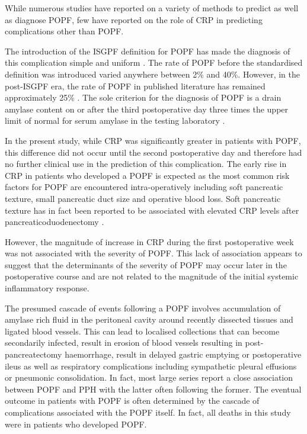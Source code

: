While numerous studies have reported on a variety of methods to predict as well as diagnose POPF, few have reported on the role of CRP in predicting complications other than POPF.

The introduction of the ISGPF definition for POPF has made the diagnosis of this complication simple and uniform \parencite{bassi_postoperative_2005}.
The rate of POPF before the standardised definition was introduced varied anywhere between 2\% and 40\%. 
However, in the post-ISGPF era, the rate of POPF in published literature has remained approximately 25\% \parencite{knight_evaluation_2010}. 
The sole criterion for the diagnosis of POPF is a drain amylase content on or after the third postoperative day three times the upper limit of normal for serum amylase in the testing laboratory \parencite{bassi_postoperative_2005} . 

In the present study, while CRP was significantly greater in patients with POPF, this difference did not occur until the second postoperative day and therefore had no further clinical use in the prediction of this complication. 
The early rise in CRP in patients who developed a POPF is expected as the most common risk factors for POPF are encountered intra-operatively including soft pancreatic texture, small pancreatic duct size and operative blood loss. 
Soft pancreatic texture has in fact been reported to be associated with elevated CRP levels after pancreaticoduodenectomy \parencite{murakami_soft_2008}.

However, the magnitude of increase in CRP during the first postoperative week was not associated with the severity of POPF. 
This lack of association appears to suggest that the determinants of the severity of POPF may occur later in the postoperative course and are not related to the magnitude of the initial systemic inflammatory response.

The presumed cascade of events following a POPF involves accumulation of amylase rich fluid in the peritoneal cavity around recently dissected tissues and ligated blood vessels. 
This can lead to localised collections that can become secondarily infected, result in erosion of blood vessels resulting in post-pancreatectomy haemorrhage, result in delayed gastric emptying or postoperative ileus as well as respiratory complications including sympathetic pleural effusions or pneumonic consolidation. 
In fact, most large series report a close association between POPF and PPH with the latter often following the former. 
The eventual outcome in patients with POPF is often determined by the cascade of complications associated with the POPF itself. 
In fact, all deaths in this study were in patients who developed POPF.

